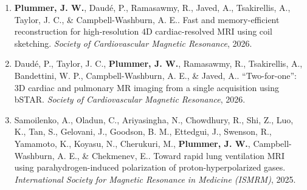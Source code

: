 \documentclass[12pt,]{scrartcl}
\begin{document}
\begin{enumerate}
  \leftskip-0.13in %





  \item \textbf{Plummer, J. W.}, Daudé, P., Ramasawmy, R., Javed, A., Tsakirellis, A., Taylor, J. C., \& Campbell-Washburn, A. E.. Fast and memory-efficient reconstruction for high-resolution 4D cardiac-resolved MRI using coil sketching. \textit{Society of Cardiovascular Magnetic Resonance}, 2026.


    \item Daudé, P., Taylor, J. C., \textbf{Plummer, J. W.}, Ramasawmy, R., Tsakirellis, A., Bandettini, W. P., Campbell-Washburn, A. E., \& Javed, A.. ``Two-for-one'': 3D cardiac and pulmonary MR imaging from a single acquisition using bSTAR. \textit{Society of Cardiovascular Magnetic Resonance}, 2026.



    \item Samoilenko, A., Oladun, C., Ariyasingha, N., Chowdhury, R., Shi, Z., Luo, K., Tan, S., Gelovani, J., Goodson, B. M., Ettedgui, J., Swenson, R., Yamamoto, K., Koyasu, N., Cherukuri, M., \textbf{Plummer, J. W.}, Campbell-Washburn, A. E., \& Chekmenev, E.. Toward rapid lung ventilation MRI using parahydrogen-induced polarization of proton-hyperpolarized gases. \textit{International Society for Magnetic Resonance in Medicine (ISMRM)}, 2025.


\end{enumerate}
\end{document}
